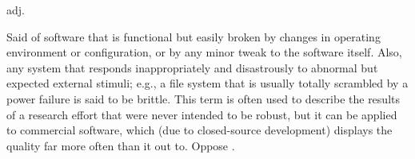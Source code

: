  adj.

Said of software that is functional but easily broken by changes in operating
environment or configuration, or by any minor tweak to the software itself.
Also, any system that responds inappropriately and disastrously to abnormal but
expected external stimuli; e.g., a file system that is usually totally scrambled
by a power failure is said to be brittle. This term is often used to describe
the results of a research effort that were never intended to be robust, but it
can be applied to commercial software, which (due to closed-source development)
displays the quality far more often than it out to. Oppose .

